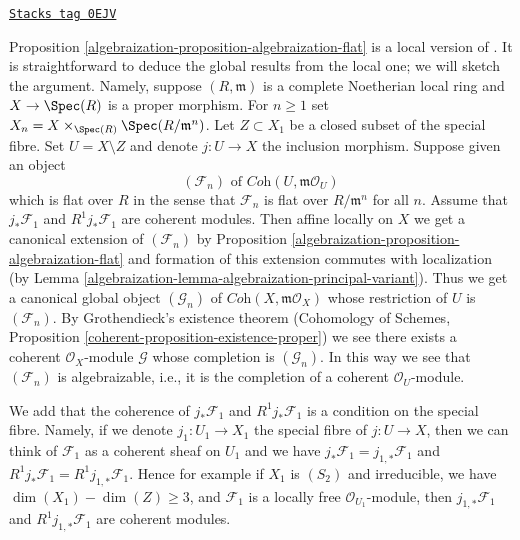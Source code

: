 \begin{remark}
\label{algebraization-remark-interesting-case-quater}
\href{https://stacks.math.columbia.edu/tag/0EJV}{\texttt{Stacks tag 0EJV}}

Proposition \ref{algebraization-proposition-algebraization-flat} is a local version
of \cite[Theorem 2.10 (i)]{Baranovsky}. It is straightforward to deduce
the global results from the local one; we will sketch the argument.
Namely, suppose $(R, \mathfrak m)$
is a complete Noetherian local ring and $X \to \Spec(R)$ is a proper morphism.
For $n \geq 1$ set $X_n = X \times_{\Spec(R)} \Spec(R/\mathfrak m^n)$.
Let $Z \subset X_1$ be a closed subset of the special fibre.
Set $U = X \setminus Z$ and denote $j : U \to X$ the inclusion morphism.
Suppose given an object
$$
(\mathcal{F}_n) \text{ of } \textit{Coh}(U, \mathfrak m\mathcal{O}_U)
$$
which is flat over $R$ in the sense that $\mathcal{F}_n$ is flat over
$R/\mathfrak m^n$ for all $n$.
Assume that $j_*\mathcal{F}_1$ and $R^1j_*\mathcal{F}_1$ are coherent
modules. Then affine locally on $X$ we get a canonical extension
of $(\mathcal{F}_n)$ by
Proposition \ref{algebraization-proposition-algebraization-flat}
and formation of this extension commutes with localization
(by Lemma \ref{algebraization-lemma-algebraization-principal-variant}).
Thus we get a canonical global object $(\mathcal{G}_n)$ of
$\textit{Coh}(X, \mathfrak m\mathcal{O}_X)$
whose restriction of $U$ is $(\mathcal{F}_n)$.
By Grothendieck's existence theorem
(Cohomology of Schemes, Proposition
\ref{coherent-proposition-existence-proper})
we see there exists a coherent $\mathcal{O}_X$-module
$\mathcal{G}$ whose completion is $(\mathcal{G}_n)$.
In this way we see that $(\mathcal{F}_n)$ is algebraizable, i.e.,
it is the completion of a coherent $\mathcal{O}_U$-module.

\medskip\noindent
We add that the coherence of $j_*\mathcal{F}_1$ and $R^1j_*\mathcal{F}_1$
is a condition on the special fibre. Namely, if we denote
$j_1 : U_1 \to X_1$ the special fibre of $j : U \to X$, then we can
think of $\mathcal{F}_1$ as a coherent sheaf on $U_1$ and we have
$j_*\mathcal{F}_1 = j_{1, *}\mathcal{F}_1$ and
$R^1j_*\mathcal{F}_1 = R^1j_{1, *}\mathcal{F}_1$.
Hence for example if $X_1$ is $(S_2)$ and irreducible, we have
$\dim(X_1) - \dim(Z) \geq 3$, and $\mathcal{F}_1$ is a locally free
$\mathcal{O}_{U_1}$-module, then $j_{1, *}\mathcal{F}_1$ and
$R^1j_{1, *}\mathcal{F}_1$ are coherent modules.
\end{remark}


